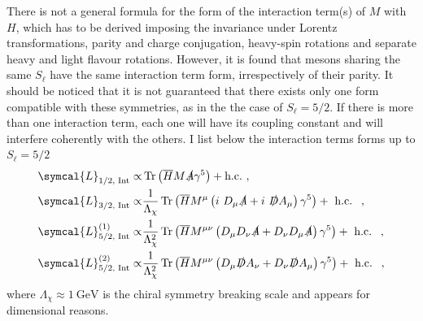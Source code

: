 There is not a general formula for the form of the interaction term(s) of $M$ with $H$, which has to be derived imposing the invariance under Lorentz transformations, parity and charge conjugation, heavy-spin rotations and separate heavy and light flavour rotations. However, it is found that mesons sharing the same $S_\ell$ have the same interaction term form, irrespectively of their parity. It should be noticed that it is not guaranteed that there exists only one form compatible with these symmetries, as in the the case of $S_\ell = 5/2$. If there is more than one interaction term, each one will have its coupling constant and will interfere coherently with the others. I list below the interaction terms forms up to $S_\ell = 5/2$
\begin{subequations}
  \begin{align}
    \symcal{L}_{1/2 \text{, Int}} \propto& \tr{\left( \adj{H} M \slashed{A} \gamma^5 \right)} + \text{h.c.} \ , \\
    \symcal{L}_{3/2 \text{, Int}} \propto& \frac{1}{\Lambda_\chi} \tr{\left( \adj{H} M^\mu \left( i \ D_\mu \slashed{A} + i \ \slashed{D} A_\mu \right) \gamma^5 \right)} + \text{ h.c. } \ , \\
    \symcal{L}^{(1)}_{5/2 \text{, Int}} \propto& \frac{1}{\Lambda_\chi^2} \tr{\left( \adj{H} M^{\mu \nu} \left( D_\mu D_\nu \slashed{A} + D_\nu D_\mu \slashed{A} \right) \gamma^5 \right)} + \text{ h.c. } \ , \\ 
    \symcal{L}^{(2)}_{5/2 \text{, Int}} \propto& \frac{1}{\Lambda_\chi^2} \tr{\left( \adj{H} M^{\mu \nu} \left( D_\mu \slashed{D} A_\nu + D_\nu \slashed{D} A_\mu \right) \gamma^5 \right)} + \text{ h.c. } \ ,
  \end{align}
  \label{eqs:HChPT_interaction_Lagrangians}
\end{subequations}
where $\Lambda_\chi \approx 1 \ \text{GeV}$ is the chiral symmetry breaking scale and appears for dimensional reasons.


